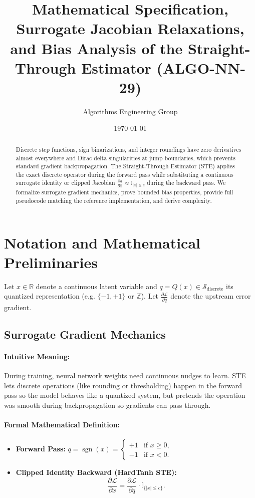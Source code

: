\documentclass[11pt]{article}
\title{\textbf{Mathematical Specification, Surrogate Jacobian Relaxations, and Bias Analysis of the Straight-Through Estimator (ALGO-NN-29)}}
\author{Algorithms Engineering Group}
\date{\today}
\begin{document}
\maketitle

\begin{abstract}
Discrete step functions, sign binarizations, and integer roundings have zero derivatives almost everywhere and Dirac delta singularities at jump boundaries, which prevents standard gradient backpropagation. The Straight-Through Estimator (STE) applies the exact discrete operator during the forward pass while substituting a continuous surrogate identity or clipped Jacobian $\frac{\partial q}{\partial x} \approx \mathbb{I}_{|x| \le c}$ during the backward pass. We formalize surrogate gradient mechanics, prove bounded bias properties, provide full pseudocode matching the reference implementation, and derive complexity.
\end{abstract}

\section{Notation and Mathematical Preliminaries}
\label{sec:notation}

Let $x \in \mathbb{R}$ denote a continuous latent variable and $q = Q(x) \in \mathcal{S}_{\mathrm{discrete}}$ its quantized representation (e.g. $\{-1, +1\}$ or $\mathbb{Z}$). Let $\frac{\partial \mathcal{L}}{\partial q}$ denote the upstream error gradient.

\subsection{Surrogate Gradient Mechanics}
\paragraph{Intuitive Meaning:} During training, neural network weights need continuous nudges to learn. STE lets discrete operations (like rounding or thresholding) happen in the forward pass so the model behaves like a quantized system, but pretends the operation was smooth during backpropagation so gradients can pass through.

\paragraph{Formal Mathematical Definition:}
\begin{itemize}
    \item \textbf{Forward Pass:} $q = \operatorname{sgn}(x) = \begin{cases} +1 & \text{if } x \ge 0, \\ -1 & \text{if } x < 0. \end{cases}$
    \item \textbf{Clipped Identity Backward (HardTanh STE):}
    \begin{equation}
    \label{eq:ste_backward}
    \frac{\partial \mathcal{L}}{\partial x} = \frac{\partial \mathcal{L}}{\partial q} \cdot \mathbb{I}_{\{|x| \le c\}}.
    \end{equation}
\end{itemize}
\end{document}
